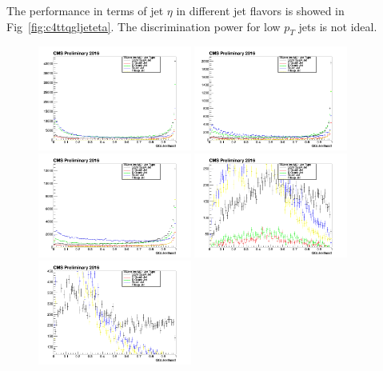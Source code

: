 The performance in terms of jet $\eta$ in different jet flavors is showed in Fig~\ref{fig:c4ttqgljeteta}. The discrimination power for low $p_{T}$ jets is not ideal. 
\begin{figure}[htbp]
 \begin{center}
  \includegraphics[width=0.45\textwidth]{sections/mc4/TopTagger/figures/_b_qglikelihoodjetetabin0_.png}
  \includegraphics[width=0.45\textwidth]{sections/mc4/TopTagger/figures/_b_qglikelihoodjetetabin1_.png} \\
  \includegraphics[width=0.45\textwidth]{sections/mc4/TopTagger/figures/_b_qglikelihoodjetetabin2_.png}
  \includegraphics[width=0.45\textwidth]{sections/mc4/TopTagger/figures/_b_qglikelihoodjetetabin3_.png} \\
  \includegraphics[width=0.45\textwidth]{sections/mc4/TopTagger/figures/_b_qglikelihoodjetetabin4_.png}

\end{center}
\end{figure}
